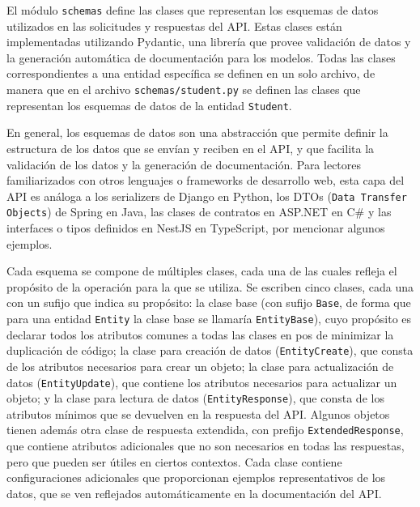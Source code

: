 El módulo \texttt{schemas} define las clases que representan los esquemas de datos utilizados en las solicitudes y respuestas del \gls{API}. Estas clases están implementadas utilizando \gls{Pydantic}, una librería que provee validación de datos y la generación automática de documentación para los modelos. Todas las clases correspondientes a una entidad específica se definen en un solo archivo, de manera que en el archivo \texttt{schemas/student.py} se definen las clases que representan los esquemas de datos de la entidad \texttt{Student}.

En general, los esquemas de datos son una abstracción que permite definir la estructura de los datos que se envían y reciben en el \gls{API}, y que facilita la validación de los datos y la generación de documentación. Para lectores familiarizados con otros lenguajes o frameworks de desarrollo web, esta capa del \gls{API} es análoga a los serializers de Django en \gls{Python}, los DTOs (\texttt{Data Transfer Objects}) de Spring en Java, las clases de contratos en ASP.NET en C\# y las interfaces o tipos definidos en NestJS en TypeScript, por mencionar algunos ejemplos.

Cada esquema se compone de múltiples clases, cada una de las cuales refleja el propósito de la operación para la que se utiliza. Se escriben cinco clases, cada una con un sufijo que indica su propósito: la clase base (con sufijo \texttt{Base}, de forma que para una entidad \texttt{Entity} la clase base se llamaría \texttt{EntityBase}), cuyo propósito es declarar todos los atributos comunes a todas las clases en pos de minimizar la duplicación de código; la clase para creación de datos (\texttt{EntityCreate}), que consta de los atributos necesarios para crear un objeto; la clase para actualización de datos (\texttt{EntityUpdate}), que contiene los atributos necesarios para actualizar un objeto; y la clase para lectura de datos (\texttt{EntityResponse}), que consta de los atributos mínimos que se devuelven en la respuesta del \gls{API}. Algunos objetos tienen además otra clase de respuesta extendida, con prefijo \texttt{ExtendedResponse}, que contiene atributos adicionales que no son necesarios en todas las respuestas, pero que pueden ser útiles en ciertos contextos. Cada clase contiene configuraciones adicionales que proporcionan ejemplos representativos de los datos, que se ven reflejados automáticamente en la documentación del \gls{API}.

